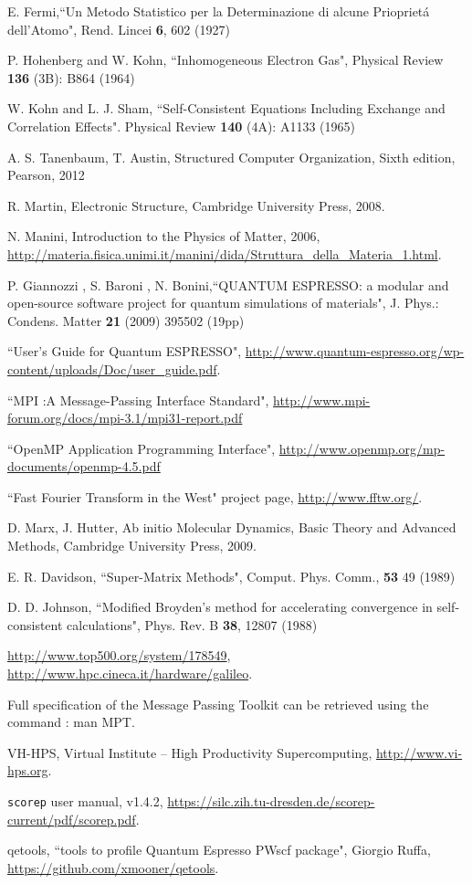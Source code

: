 \documentclass[a4paper,12pt]{article}
\begin{document}
\begin{thebibliography}{9}
E. Fermi,``Un Metodo Statistico per la Determinazione di alcune Priopriet\'a dell'Atomo", Rend. Lincei \textbf{6}, 602 (1927)

P. Hohenberg and W. Kohn, ``Inhomogeneous Electron Gas",  Physical Review \textbf{136} (3B): B864 (1964)

W. Kohn and L. J. Sham, ``Self-Consistent Equations Including Exchange and Correlation Effects". Physical Review \textbf{140} (4A): A1133 (1965)


A. S. Tanenbaum, T. Austin,
Structured Computer Organization,
Sixth edition,
Pearson,
2012


R. Martin, 
Electronic Structure,
Cambridge University Press,
2008.

N. Manini, 
Introduction to the Physics of Matter,
2006,
\url{http://materia.fisica.unimi.it/manini/dida/Struttura_della_Materia_1.html}.


P. Giannozzi , S. Baroni , N. Bonini,``QUANTUM ESPRESSO: a modular and open-source software project for quantum simulations of materials", J. Phys.: Condens. Matter \textbf{21} (2009) 395502 (19pp)

``User's Guide for Quantum ESPRESSO", \url{http://www.quantum-espresso.org/wp-content/uploads/Doc/user_guide.pdf}.

``MPI :A Message-Passing Interface Standard", \url{http://www.mpi-forum.org/docs/mpi-3.1/mpi31-report.pdf}

``OpenMP Application Programming Interface", \url{http://www.openmp.org/mp-documents/openmp-4.5.pdf}

``Fast Fourier Transform in the West" project page, \url{http://www.fftw.org/}.


D. Marx, J. Hutter,
Ab initio Molecular Dynamics,
Basic Theory and Advanced Methods,
Cambridge University Press,
2009.

E. R. Davidson, ``Super-Matrix Methods", Comput. Phys. Comm., \textbf{53} 49 (1989)

D. D. Johnson, ``Modified Broyden’s method for accelerating convergence in self-consistent calculations", Phys. Rev. B \textbf{38}, 12807 (1988)

\url{http://www.top500.org/system/178549},
\url{http://www.hpc.cineca.it/hardware/galileo}.

Full specification of the Message Passing Toolkit can be retrieved using the command : man MPT.

VH-HPS, 
Virtual Institute – High Productivity Supercomputing, 
\url{http://www.vi-hps.org}.

\texttt{scorep} user manual, 
v1.4.2,
\url{https://silc.zih.tu-dresden.de/scorep-current/pdf/scorep.pdf}.

qetools, ``tools to profile Quantum Espresso PWscf package", Giorgio Ruffa, \url{https://github.com/xmooner/qetools}.



\end{thebibliography}
\end{document}
